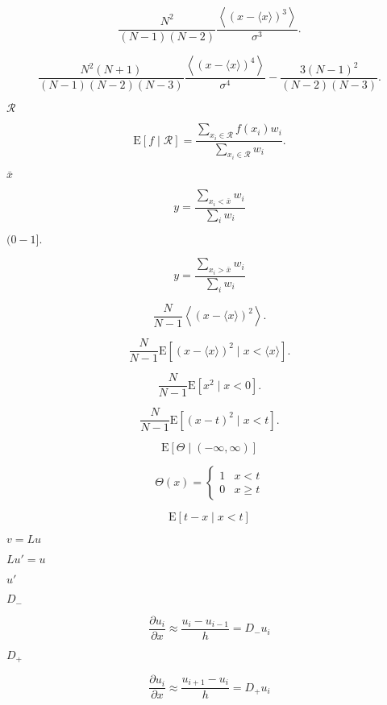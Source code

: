\documentclass{article}
\begin{document}
\[ \frac{N^2}{(N-1)(N-2)} \frac{\left\langle \left(
    x-\langle x \rangle \right)^3 \right\rangle}{\sigma^3}. \]
\pagebreak

\[ \frac{N^2(N+1)}{(N-1)(N-2)(N-3)}
    \frac{\left\langle \left(x-\langle x \rangle \right)^4
    \right\rangle}{\sigma^4} - \frac{3(N-1)^2}{(N-2)(N-3)}. \]
\pagebreak

$ \mathcal{R} $
\pagebreak

\[ \mathrm{E}\left[f \;|\; \mathcal{R}\right] =
    \frac{\sum_{x_i \in \mathcal{R}} f(x_i) w_i}{
          \sum_{x_i \in \mathcal{R}} w_i}. \]
\pagebreak

$ \bar{x} $
\pagebreak

\[ y = \frac{\sum_{x_i < \bar{x}} w_i}{
              \sum_i w_i} \]
\pagebreak

$ (0-1]. $
\pagebreak

\[ y = \frac{\sum_{x_i > \bar{x}} w_i}{
              \sum_i w_i} \]
\pagebreak

\[ \frac{N}{N-1} \left\langle \left(
    x-\langle x \rangle \right)^2 \right\rangle. \]
\pagebreak

\[ \frac{N}{N-1}
    \mathrm{E}\left[ (x-\langle x \rangle)^2 \;|\;
                      x < \langle x \rangle \right]. \]
\pagebreak

\[ \frac{N}{N-1}
    \mathrm{E}\left[ x^2 \;|\; x < 0\right]. \]
\pagebreak

\[ \frac{N}{N-1}
    \mathrm{E}\left[ (x-t)^2 \;|\;
                      x < t \right]. \]
\pagebreak

\[ \mathrm{E}\left[ \Theta \;|\; (-\infty,\infty) \right] \]
\pagebreak

\[ \Theta(x) = \left\{
    \begin{array}{ll}
    1 & x < t \\
    0 & x \geq t
    \end{array}
    \right. \]
\pagebreak

\[ \mathrm{E}\left[ t-x \;|\; x<t \right] \]
\pagebreak

$ v = Lu $
\pagebreak

$ Lu' = u $
\pagebreak

$ u' $
\pagebreak

$ D_{-} $
\pagebreak

\[ \frac{\partial u_{i}}{\partial x} \approx
    \frac{u_{i}-u_{i-1}}{h} = D_{-} u_{i}
\]
\pagebreak

$ D_{+} $
\pagebreak

\[ \frac{\partial u_{i}}{\partial x} \approx
    \frac{u_{i+1}-u_{i}}{h} = D_{+} u_{i}
\]
\pagebreak
\end{document}
